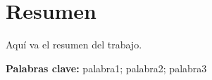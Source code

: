 %
%
%
%
%
%
%
%
%

\chapter*{Resumen}

Aquí va el resumen del trabajo.

\vspace{0.5cm}

\textbf{Palabras clave:} palabra1; palabra2; palabra3




